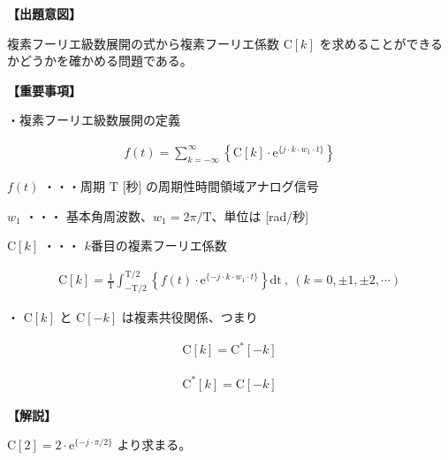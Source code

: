 \noindent \textbf{【出題意図】}

\bigskip
\noindent 複素フーリエ級数展開の式から複素フーリエ係数 $\textrm{C}[k]$ を求めることができるかどうかを確かめる問題である。

\vspace{1em}
\noindent \textbf{【重要事項】}

\medskip
\noindent ・複素フーリエ級数展開の定義

\begin{align*}
f(t) = \sum_{k = -\infty}^{\infty} 
\left \{
\textrm{C}[k] \cdot \textrm{e}^{\{j \cdot k \cdot w_1 \cdot t \}}
\right \}
\end{align*}

\medskip
\noindent $f(t)$ ・・・周期 $\textrm{T}$ [秒] の周期性時間領域アナログ信号

\medskip
\noindent $w_1$ ・・・ 基本角周波数、$w_1 = 2\pi/\textrm{T}$、単位は [rad/秒]

\medskip
\noindent $\textrm{C}[k]$ ・・・ $k$番目の複素フーリエ係数

\begin{align*}
\textrm{C}[k] = \frac{1}{\textrm{T}} \int_{-\textrm{T}/2}^{\textrm{T}/2} 
\left \{
f(t) \cdot \textrm{e}^{\{-j \cdot k \cdot w_1 \cdot t \}} 
\right \}
\textrm{dt}
\ ,\  (k = 0, \pm 1, \pm 2, \cdots)
\end{align*}

\bigskip
\noindent ・ $\textrm{C}[k]$ と $\textrm{C}[-k]$ は複素共役関係、つまり

\begin{align*}
\textrm{C}[k] = \textrm{C}^{*}[-k]
\end{align*}

\begin{align*}
\textrm{C}^{*}[k] = \textrm{C}[-k]
\end{align*}

\bigskip

\vspace{1em}
\noindent \textbf{【解説】}

\bigskip
\noindent $\textrm{C}[2] =  2 \cdot \textrm{e}^{\{-j \cdot \pi/2 \}}$ より求まる。
